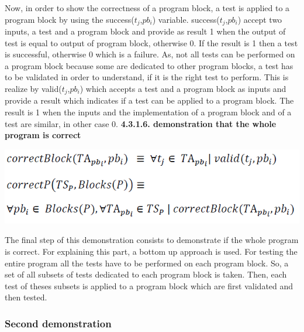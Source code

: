 \documentclass[conference,compsoc]{IEEEtran}
\begin{document}
Now, in order to show the correctness of a program block, a test is applied to a program block by using the success($t_j$,$pb_i$) variable. 
\newline
success($t_j$,$pb_i$) accept two inputs, a test and a program block and provide as result 1 when the output of test is equal to output of program block, otherwise 0. If the result is 1 then a test is successful, otherwise 0 which is a failure. 
\newline                                                                                                                                                   As, not all tests can be performed on a program block because some are dedicated to other program blocks, a test has to be validated in order to understand, if it is the right test to perform. This is realize by valid($t_j$,$pb_i$) which accepts a test and a program block as inputs and provide a result which indicates if a test can be applied to a program block. The result is 1 when the inputs and the implementation of a program block and of a test are similar, in other case 0. %
\noindent
\newline\newline
\textbf{4.3.1.6. demonstration that the whole program is correct}
\begin{center}
\includegraphics[scale=0.5]{Proof1-Part6.png} 
\end{center}

The final step of this demonstration consists to demonstrate if the whole program is correct. For explaining this part, a bottom up approach is used. 
\newline
For testing the entire program all the tests have to be performed on each program block. So, a set of all subsets of tests dedicated to each program block is taken. Then, each test of theses subsets is applied to a program block which are first validated and then tested. 
\subsubsection{Second demonstration}
\end{document}
